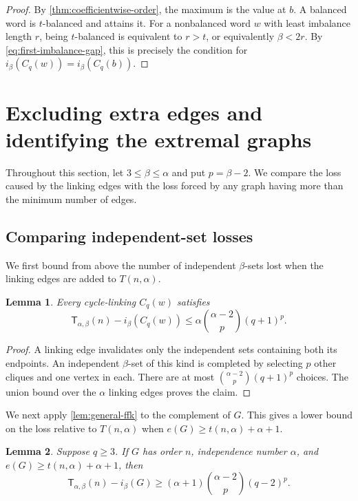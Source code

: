 \documentclass[11pt]{article}
\newtheorem{lemma}[lemma]{Lemma}
\theoremstyle{definition}
\newcommand{\turcl}[3]{\mathsf{T}_{#1,#2}(#3)}
\begin{document}
\begin{proof}
By \cref{thm:coefficientwise-order}, the maximum is the value at $b$.
A balanced word is $t$-balanced and attains it. For a nonbalanced word
$w$ with least imbalance length $r$, being $t$-balanced is equivalent
to $r>t$, or equivalently $\beta<2r$. By
\eqref{eq:first-imbalance-gap}, this is precisely the condition for
$i_\beta(C_q(w))=i_\beta(C_q(b))$.
\end{proof}


\section{Excluding extra edges and identifying the extremal graphs}
\label{sec:global-reduction}

Throughout this section, let $3\le\beta\le\alpha$ and put
$p=\beta-2$. We compare the loss caused by the linking edges with
the loss forced by any graph having more than the minimum number
of edges.

\subsection{Comparing independent-set losses}
We first bound from above the number of independent $\beta$-sets
lost when the linking edges are added to $T(n,\alpha)$.
\begin{lemma}\label{lem:cycle-loss}
Every cycle-linking $C_q(w)$ satisfies
\begin{equation}\label{eq:cycle-loss-bound}
 \turcl{\alpha}{\beta}{n}-i_\beta(C_q(w))
 \le\alpha\binom{\alpha-2}{p}(q+1)^p.
\end{equation}
\end{lemma}

\begin{proof}
A linking edge invalidates only the independent sets containing both
its endpoints. An independent $\beta$-set of this kind is completed
by selecting $p$ other cliques and one vertex in each. There are at
most $\binom{\alpha-2}{p}(q+1)^p$ choices. The union bound over the
$\alpha$ linking edges proves the claim.
\end{proof}
We next apply \cref{lem:general-ffk} to the complement of $G$.
This gives a lower bound on the loss relative to $T(n,\alpha)$
when $e(G)\ge t(n,\alpha)+\alpha+1$.
\begin{lemma}\label{lem:ffk-loss}
Suppose $q\ge3$. If $G$ has order $n$, independence number $\alpha$,
and $e(G)\ge t(n,\alpha)+\alpha+1$, then
\begin{equation}\label{eq:ffk-loss-lower}
 \turcl{\alpha}{\beta}{n}-i_\beta(G)
 \ge(\alpha+1)\binom{\alpha-2}{p}(q-2)^p.
\end{equation}
\end{lemma}
\end{document}
